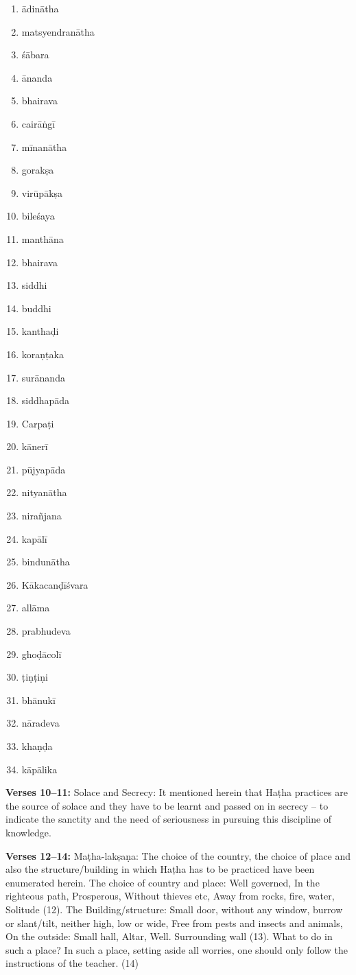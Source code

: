 \begin{multicols}{3}
\begin{enumerate}
\itemsep=0pt
\item ādinātha
\item matsyendranātha
\item śābara
\item ānanda
\item bhairava 
\item cairāṅgī 
\item mīnanātha
\item gorakṣa 
\item virūpākṣa 
\item bileśaya 
\item manthāna
\item bhairava 
\item siddhi
\item buddhi
\item kanthaḍi 
\item koraṇṭaka 
\item surānanda
\item siddhapāda 
\item Carpaṭi
\item kānerī
\item pūjyapāda
\item nityanātha
\item nirañjana
\item kapālī 
\item bindunātha
\item Kākacanḍīśvara
\item allāma
\item prabhudeva
\item ghoḍācolī
\item ṭiṇṭiṇi
\item bhānukī
\item nāradeva
\item khaṇḍa
\item kāpālika
\end{enumerate}
\end{multicols}

\textbf{Verses 10--11:} Solace and Secrecy: It mentioned herein that Haṭha practices are the source of solace and they have to be learnt and passed on in secrecy – to indicate the sanctity and the need of seriousness in pursuing this discipline of knowledge.

\textbf{Verses 12--14:} Maṭha-lakṣaṇa: The choice of the country, the choice of place and also the structure/building in which Haṭha has to be practiced have been enumerated herein.  The choice of country and place: Well governed, In the righteous path, Prosperous, Without thieves etc, Away from rocks, fire, water, Solitude (12). The Building/structure: Small door, without any window, burrow or slant/tilt, neither high, low or wide, Free from pests and insects and animals, On the outside: Small hall, Altar, Well. Surrounding wall (13). What to do in such a place?  In such a place, setting aside all worries, one should only follow the instructions of the teacher. (14)

